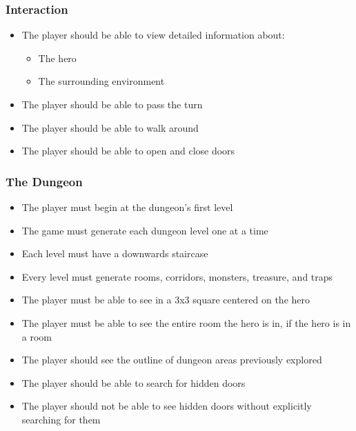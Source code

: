 \documentclass[12pt, titlepage]{article}
\begin{document}
		\subsubsection{Interaction}
		\begin{itemize}
			\item The player should be able to view detailed information about:
			\begin{itemize}
				\item The hero
				\item The surrounding environment
			\end{itemize}
			\item The player should be able to pass the turn
			\item The player should be able to walk around
			\item The player should be able to open and close doors
		\end{itemize}

		\subsubsection{The Dungeon}
			\begin{itemize}
				\item The player must begin at the dungeon's first level
				\item The game must generate each dungeon level one at a time
				\item Each level must have a downwards staircase
				\item Every level must generate rooms, corridors, monsters, treasure, and traps
				\item The player must be able to see in a 3x3 square centered on the hero
				\item The player must be able to see the entire room the hero is in, if the hero is in a room
				\item The player should see the outline of dungeon areas previously explored
				\item The player should be able to search for hidden doors
				\item The player should not be able to see hidden doors without explicitly searching for them
			\end{itemize}
\end{document}
